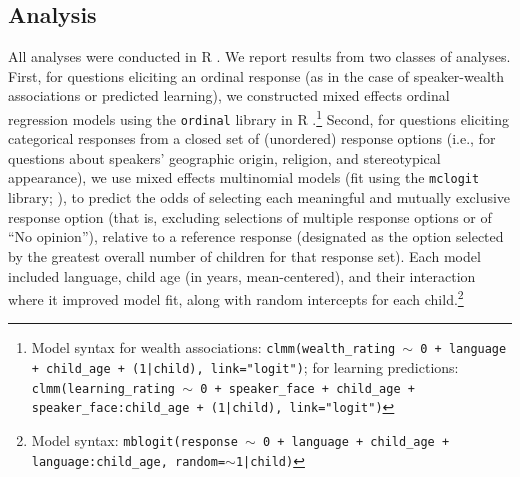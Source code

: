 \documentclass{foushee-adapted-preprint}
\begin{document}
\subsection{Analysis}
All analyses were conducted in R \parencite{R}. 
We report results from two classes of analyses. 
First, for questions eliciting an ordinal response (as in the case of speaker-wealth associations or predicted learning), we constructed mixed effects ordinal regression models using the \texttt{ordinal} library in R \parencite{R, ordinalR}.\footnote{Model syntax for wealth associations: \texttt{clmm(wealth\_rating $\sim$ 0 + language + child\_age + (1|child), link="logit")}; for learning predictions: \texttt{clmm(learning\_rating $\sim$ 0 + speaker\_face + child\_age + speaker\_face:child\_age + (1|child), link="logit")}}
Second, for questions eliciting categorical responses from a closed set of (unordered) response options (i.e., for questions about speakers' geographic origin, religion, and stereotypical appearance), we use mixed effects multinomial models (fit using the \texttt{mclogit} library; \cite{mclogit}), to predict the odds of selecting each meaningful and mutually exclusive response option (that is, excluding selections of multiple response options or of ``No opinion''), relative to a reference response (designated as the option selected by the greatest overall number of children for that response set). Each model included language, child age (in years, mean-centered), and their interaction where it improved model fit, along with random intercepts for each child.\footnote{Model syntax: \texttt{mblogit(response $\sim$ 0 + language + child\_age + language:child\_age, random=$\sim$1|child)}} %
 
\end{document}
